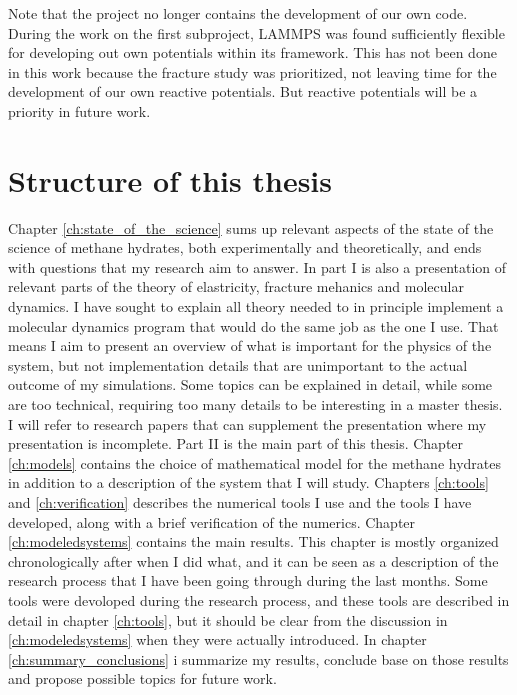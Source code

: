Note that the project no longer contains the development of our own code. During the work on the first subproject, LAMMPS was found sufficiently flexible for developing out own potentials within its framework. This has not been done in this work because the fracture study was prioritized, not leaving time for the development of our own reactive potentials. But reactive potentials will be a priority in future work.

\section{Structure of this thesis}

Chapter \ref{ch:state_of_the_science} sums up relevant aspects of the state of the science of methane hydrates, both experimentally and theoretically, and ends with questions that my research aim to answer.
In part I is also a presentation of relevant parts of the theory of elastricity, fracture mehanics and molecular dynamics. I have sought to explain all theory needed to in principle implement a molecular dynamics program that would do the same job as the one I use. That means I aim to present an overview of what is important for the physics of the system, but not implementation details that are unimportant to the actual outcome of my simulations. Some topics can be explained in detail, while some are too technical, requiring too many details to be interesting in a master thesis. I will refer to research papers that can supplement the presentation where my presentation is incomplete. Part II is the main part of this thesis. Chapter \ref{ch:models} contains the choice of mathematical model for the methane hydrates in addition to a description of the system that I will study. Chapters \ref{ch:tools} and \ref{ch:verification} describes the numerical tools I use and the tools I have developed, along with a brief verification of the numerics. Chapter \ref{ch:modeledsystems} contains the main results. This chapter is mostly organized chronologically after when I did what, and it can be seen as a description of the research process that I have been going through during the last months. Some tools were devoloped during the research process, and these tools are described in detail in chapter \ref{ch:tools}, but it should be clear from the discussion in \ref{ch:modeledsystems} when they were actually introduced. In chapter \ref{ch:summary_conclusions} i summarize my results, conclude base on those results and propose possible topics for future work.


